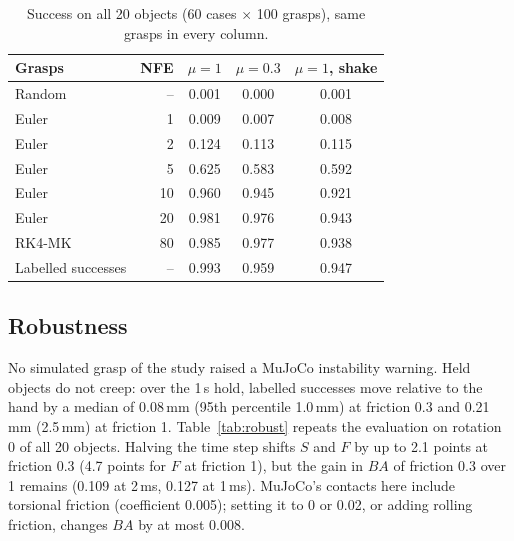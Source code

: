 \documentclass[conference]{IEEEtran}
\begin{document}
\begin{table}[!h]
  \centering
  \caption{Success on all 20 objects (60 cases $\times$ 100 grasps), same grasps in every column.}
  \label{tab:effect}
  \begin{tabular}{@{}lrccc@{}}
    \toprule
    Grasps & NFE & $\mu{=}1$ & $\mu{=}0.3$ & $\mu{=}1$, shake \\
    \midrule
    Random & -- & 0.001 & 0.000 & 0.001 \\
    Euler & 1 & 0.009 & 0.007 & 0.008 \\
    Euler & 2 & 0.124 & 0.113 & 0.115 \\
    Euler & 5 & 0.625 & 0.583 & 0.592 \\
    Euler & 10 & 0.960 & 0.945 & 0.921 \\
    Euler & 20 & 0.981 & 0.976 & 0.943 \\
    RK4-MK & 80 & 0.985 & 0.977 & 0.938 \\
    Labelled successes & -- & 0.993 & 0.959 & 0.947 \\
    \bottomrule
  \end{tabular}
\end{table}

\subsection{Robustness}\label{app:robust}

No simulated grasp of the study raised a MuJoCo instability warning. Held objects do not creep: over the
1\,s hold, labelled successes move relative to the hand by a median of 0.08\,mm (95th percentile 1.0\,mm)
at friction 0.3 and 0.21\,mm (2.5\,mm) at friction 1. Table~\ref{tab:robust} repeats the evaluation on
rotation 0 of all 20 objects. Halving the time step shifts $S$ and $F$ by up to 2.1 points at friction 0.3
(4.7 points for $F$ at friction 1), but the gain in $\mathit{BA}$ of friction 0.3 over 1 remains (0.109 at 2\,ms, 0.127 at 1\,ms). MuJoCo's contacts here include torsional
friction (coefficient 0.005); setting it to 0 or 0.02, or adding rolling friction, changes $\mathit{BA}$ by
at most 0.008.
\end{document}
